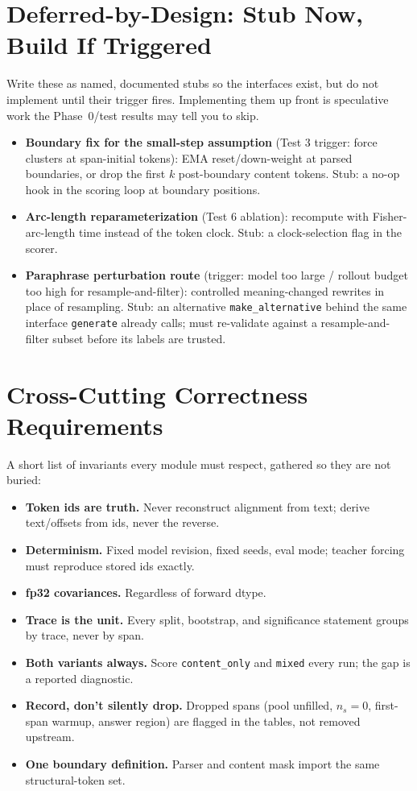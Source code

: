 \documentclass[11pt]{article}
\newcommand{\modu}[1]{\texttt{#1}}
\newcommand{\fn}[1]{\texttt{#1}}
\begin{document}
\section{Deferred-by-Design: Stub Now, Build If Triggered}
\label{sec:deferred}

Write these as named, documented stubs so the interfaces exist, but do not implement until their trigger fires. Implementing them up front is speculative work the Phase~0/test results may tell you to skip.
\begin{itemize}[leftmargin=1.5em]
  \item \textbf{Boundary fix for the small-step assumption} (Test 3 trigger: force clusters at span-initial tokens): EMA reset/down-weight at parsed boundaries, or drop the first $k$ post-boundary content tokens. Stub: a no-op hook in the scoring loop at boundary positions.
  \item \textbf{Arc-length reparameterization} (Test 6 ablation): recompute with Fisher-arc-length time instead of the token clock. Stub: a clock-selection flag in the scorer.
  \item \textbf{Paraphrase perturbation route} (trigger: model too large / rollout budget too high for resample-and-filter): controlled meaning-changed rewrites in place of resampling. Stub: an alternative \fn{make\_alternative} behind the same interface \modu{generate} already calls; must re-validate against a resample-and-filter subset before its labels are trusted.
\end{itemize}

\section{Cross-Cutting Correctness Requirements}

A short list of invariants every module must respect, gathered so they are not buried:
\begin{itemize}[leftmargin=1.5em]
  \item \textbf{Token ids are truth.} Never reconstruct alignment from text; derive text/offsets from ids, never the reverse.
  \item \textbf{Determinism.} Fixed model revision, fixed seeds, eval mode; teacher forcing must reproduce stored ids exactly.
  \item \textbf{fp32 covariances.} Regardless of forward dtype.
  \item \textbf{Trace is the unit.} Every split, bootstrap, and significance statement groups by trace, never by span.
  \item \textbf{Both variants always.} Score \texttt{content\_only} and \texttt{mixed} every run; the gap is a reported diagnostic.
  \item \textbf{Record, don't silently drop.} Dropped spans (pool unfilled, $n_s=0$, first-span warmup, answer region) are flagged in the tables, not removed upstream.
  \item \textbf{One boundary definition.} Parser and content mask import the same structural-token set.
\end{itemize}
\end{document}
